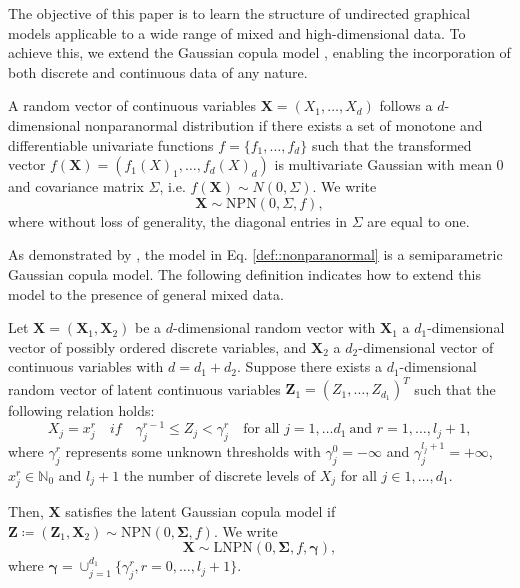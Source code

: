 The objective of this paper is to learn the structure of undirected graphical models applicable to a wide range of mixed and high-dimensional data. To achieve this, we extend the Gaussian copula model \cite{Liu09, Liu12, Xue12}, enabling the incorporation of both discrete and continuous data of any nature.

\begin{definition}
    A random vector of continuous variables \(\mathbf{X} = (X_1, \dots, X_d)\) follows a $d$-dimensional nonparanormal distribution if there exists a set of monotone and differentiable univariate functions $f = \{f_1,\dots, f_d\}$ such that the transformed vector \(f(\mathbf{X}) = (f_1(X)_1, \dots, f_d(X)_d)\) is multivariate Gaussian with mean $0$ and covariance matrix \(\Sigma\), i.e. \(f(\mathbf{X})\sim N(0,\Sigma)\). We write
    \begin{equation}\label{def::nonparanormal}
        \mathbf{X} \sim \text{NPN}(0, \Sigma, f),
    \end{equation}
    where without loss of generality, the diagonal entries in \(\Sigma\) are equal to one.
\end{definition}

As demonstrated by \citet{Liu09}, the model in Eq. \eqref{def::nonparanormal} is a semiparametric Gaussian copula model. The following definition indicates how to extend this model to the presence of general mixed data.

\begin{definition}\label{latent_gaussian_cm}
    Let $\mathbf{X} = (\mathbf{X}_1,\mathbf{X}_2)$ be a $d$-dimensional random vector with \(\mathbf{X}_1\) a $d_1$-dimensional vector of possibly ordered discrete variables, and \(\mathbf{X}_2\) a $d_2$-dimensional vector of continuous variables with \(d = d_1 + d_2\). Suppose there exists a $d_1$-dimensional random vector of latent continuous variables $\mathbf{Z}_1 = (Z_1, \dots, Z_{d_1})^T$ such that the following relation holds:
    \begin{equation}\label{latent_ordered}
        X_j = x_j^{r} \quad if \quad \gamma_j^{r-1} \leq Z_j < \gamma_j^r \quad \text{for all } j = 1, \dots d_1 \ \text{and } r = 1, \dots, l_j+1,
    \end{equation}
    where $\gamma^r_j$ represents some unknown thresholds with $\gamma_j^0 = -\infty$ and $\gamma_j^{l_j +1} = +\infty$, $x^r_j \in \mathbb{N}_0$ and $l_{j} +1$ the number of discrete levels of $X_j$ for all $j \in 1, \dots, d_1$.

    Then, $\mathbf{X}$ satisfies the latent Gaussian copula model if $\mathbf{Z} \coloneqq (\mathbf{Z}_1, \mathbf{X}_2) \sim \text{NPN}(0, \mathbf{\Sigma}, f)$. We write
    \begin{equation}
        \mathbf{X} \sim \text{LNPN}(0, \mathbf{\Sigma}, f, \mathbf{\gamma}),
    \end{equation}
    where $\mathbf{\gamma} = \cup_{j=1}^{d_1} \{\gamma_j^r, r = 0, \dots, l_j+1\}$.
\end{definition}

